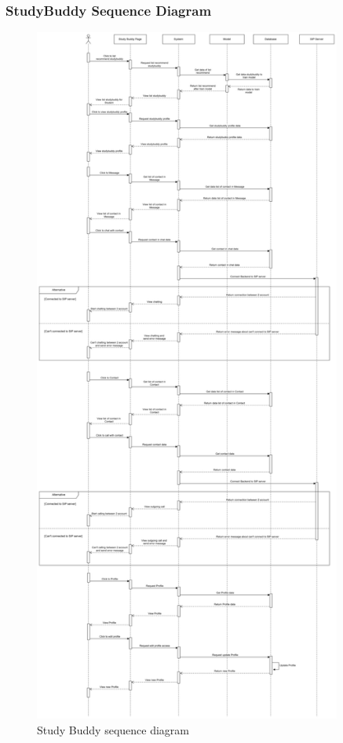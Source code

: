 \subsubsection{StudyBuddy Sequence Diagram}
    \begin{figure}[H]
        \centering
        \includegraphics[width=0.9\textwidth, height=0.9\textheight]{image/StudentStudyBuddySequence.png} 
        \caption{Study Buddy sequence diagram}
        \label{fig:studyBuddy_sequence}
    \end{figure}

